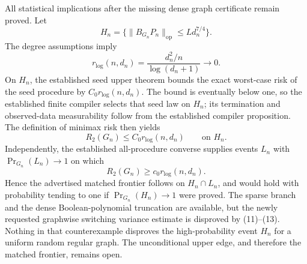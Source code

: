 All statistical implications after the missing dense graph certificate remain
proved.  Let
\[
 H_n=\{\|B_{G_n}P_n\|_{\mathrm{op}}\le Ld_n^{7/4}\}.
\]
The degree assumptions imply
\[
 r_{\log}(n,d_n)
 =\frac{d_n^2/n}{\log(d_n+1)}\longrightarrow0.
\]
On \(H_n\), the established seed upper theorem bounds the exact worst-case risk of
the seed procedure by \(C_0r_{\log}(n,d_n)\).  The bound is eventually below one,
so the established finite compiler selects that seed law on \(H_n\); its termination
and observed-data measurability follow from the established compiler proposition.
The definition of minimax risk then yields
\[
 R_2(G_n)\le C_0r_{\log}(n,d_n)\qquad\text{on }H_n.
\]
Independently, the established all-procedure converse supplies events \(L_n\) with
\(\Pr_{G_n}(L_n)\to1\) on which
\[
 R_2(G_n)\ge c_0r_{\log}(n,d_n).
\]
Hence the advertised matched frontier follows on \(H_n\cap L_n\), and would hold
with probability tending to one if \(\Pr_{G_n}(H_n)\to1\) were proved.  The sparse
branch and the dense Boolean-polynomial truncation are available, but the newly
requested graphwise switching variance estimate is disproved by (11)--(13).
Nothing in that counterexample disproves the high-probability event \(H_n\) for a
uniform random regular graph.  The unconditional upper edge, and therefore the
matched frontier, remains open.
